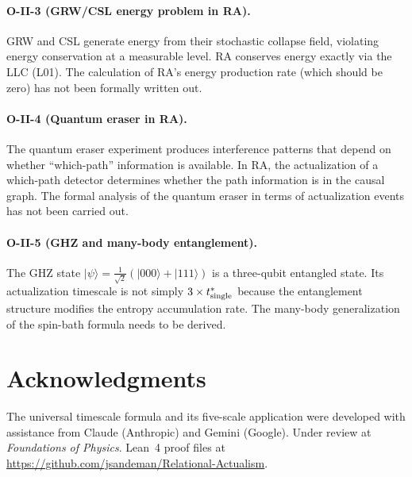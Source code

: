 \documentclass[12pt,a4paper]{article}
\begin{document}
\paragraph{O-II-3 (GRW/CSL energy problem in RA).}  GRW and CSL generate energy from their stochastic collapse field, violating energy conservation at a measurable level.  RA conserves energy exactly via the LLC (L01).  The calculation of RA's energy production rate (which should be zero) has not been formally written out.

\paragraph{O-II-4 (Quantum eraser in RA).}  The quantum eraser experiment \cite{Kim2000} produces interference patterns that depend on whether ``which-path'' information is available.  In RA, the actualization of a which-path detector determines whether the path information is in the causal graph.  The formal analysis of the quantum eraser in terms of actualization events has not been carried out.

\paragraph{O-II-5 (GHZ and many-body entanglement).}  The GHZ state $|\psi\rangle=\frac{1}{\sqrt{2}}(|000\rangle+|111\rangle)$ is a three-qubit entangled state.  Its actualization timescale is not simply $3\times t^*_{\rm single}$ because the entanglement structure modifies the entropy accumulation rate.  The many-body generalization of the spin-bath formula needs to be derived.

\section*{Acknowledgments}

The universal timescale formula and its five-scale application were developed with assistance from Claude (Anthropic) and Gemini (Google).  Under review at \textit{Foundations of Physics}.  Lean~4 proof files at \url{https://github.com/jsandeman/Relational-Actualism}.
\end{document}
